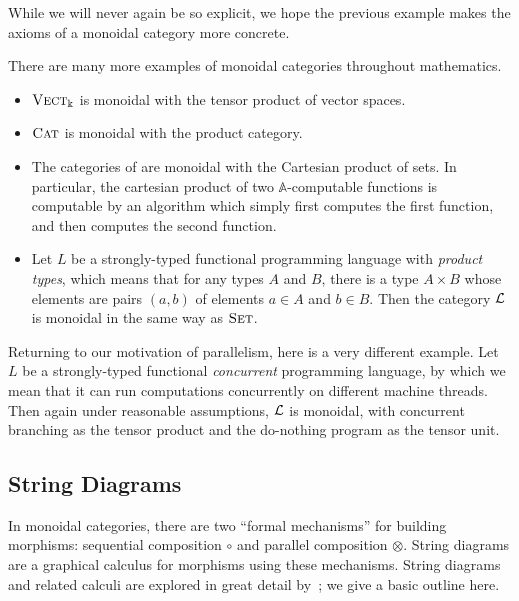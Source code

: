 While we will never again be so explicit, we hope the previous example makes the
axioms of a monoidal category more concrete.

\begin{ex}
  There are many more examples of monoidal categories throughout mathematics.
  \begin{itemize}
    \item ${\textsc{\text{Vect}}}_\Bbbk$ is monoidal with the tensor product of vector spaces.
    \item ${\textsc{\text{Cat}}}$ is monoidal with the product category.
    \item The categories of 
      are monoidal with the Cartesian product of sets. In particular, the
      cartesian product of two $\mathbb{A}$-computable functions is computable
      by an algorithm which simply first computes the first function, and then
      computes the second function.
    \item Let $L$ be a strongly-typed functional programming language with
      \emph{product types}, which means that for any types $A$ and $B$, there is
      a type $A\times B$ whose elements are pairs $(a, b)$ of elements $a\in A$
      and $b\in B$. Then the category $\mathcal{L}$ is monoidal in the same way as
      ${\textsc{\text{Set}}}$.
  \end{itemize}
\end{ex}

\begin{ex}
  Returning to our motivation of parallelism, here is a very different example.
  Let $L$ be a strongly-typed functional \emph{concurrent} programming language,
  by which we mean that it can run computations concurrently on different
  machine threads. Then again under reasonable assumptions, $\mathcal{L}$ is monoidal,
  with concurrent branching as the tensor product and the do-nothing program as
  the tensor unit.
\end{ex}

\subsection{String Diagrams}

In monoidal categories, there are two ``formal mechanisms'' for building
morphisms: sequential composition $\circ$ and parallel composition $\otimes$.
String diagrams are a graphical calculus for morphisms using these mechanisms.
String diagrams and related calculi are explored in great detail
by~\cite{selinger-2011}; we give a basic outline here.

